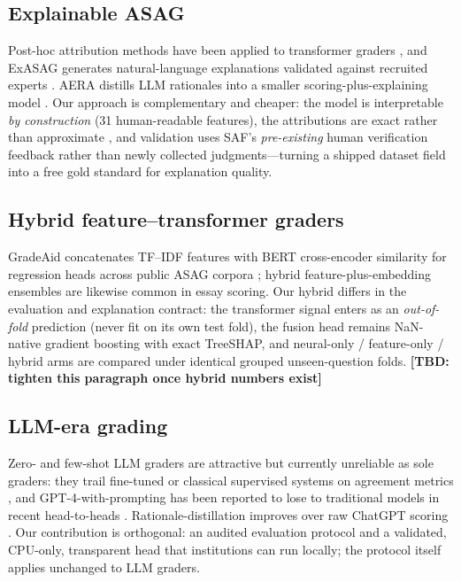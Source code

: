 \documentclass[11pt]{article}
\newcommand{\TBD}[1]{\textbf{[TBD: #1]}}
\begin{document}
\subsection{Explainable ASAG}
Post-hoc attribution methods have been applied to transformer graders
\cite{poulton2021explaining}, and ExASAG generates natural-language
explanations validated against recruited experts \cite{tornqvist2023exasag}.
AERA distills LLM rationales into a smaller scoring-plus-explaining model
\cite{li2023distilling}. Our approach is complementary and cheaper: the model
is interpretable \emph{by construction} (31 human-readable features), the
attributions are exact rather than approximate \cite{lundberg2020local}, and
validation uses SAF's \emph{pre-existing} human verification feedback rather
than newly collected judgments---turning a shipped dataset field into a free
gold standard for explanation quality.

\subsection{Hybrid feature--transformer graders}
GradeAid concatenates TF--IDF features with BERT cross-encoder similarity for
regression heads across public ASAG corpora \cite{delgobbo2023gradeaid};
hybrid feature-plus-embedding ensembles are likewise common in essay scoring.
Our hybrid differs in the evaluation and explanation contract: the transformer
signal enters as an \emph{out-of-fold} prediction (never fit on its own test
fold), the fusion head remains NaN-native gradient boosting with exact TreeSHAP,
and neural-only / feature-only / hybrid arms are compared under identical
grouped unseen-question folds. \TBD{tighten this paragraph once hybrid numbers
exist}

\subsection{LLM-era grading}
Zero- and few-shot LLM graders are attractive but currently unreliable as sole
graders: they trail fine-tuned or classical supervised systems on agreement
metrics \cite{chamieh2024llms}, and GPT-4-with-prompting has been reported to
lose to traditional models in recent head-to-heads \cite{ferreiramello2025gpt4}.
Rationale-distillation improves over raw ChatGPT scoring \cite{li2023distilling}.
Our contribution is orthogonal: an audited evaluation protocol and a validated,
CPU-only, transparent head that institutions can run locally; the protocol
itself applies unchanged to LLM graders.
\end{document}
